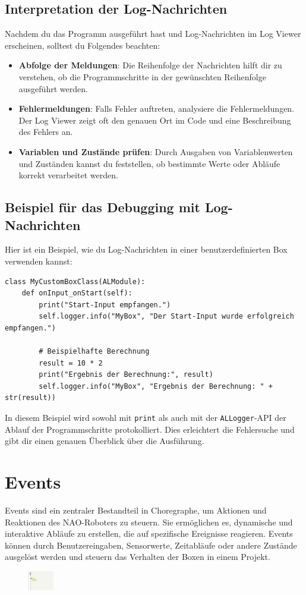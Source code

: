 \subsection{Interpretation der Log-Nachrichten}
Nachdem du das Programm ausgeführt hast und Log-Nachrichten im Log Viewer erscheinen, solltest du Folgendes beachten:
\begin{itemize}
    \item \textbf{Abfolge der Meldungen}: Die Reihenfolge der Nachrichten hilft dir zu verstehen, ob die Programmschritte in der gewünschten Reihenfolge ausgeführt werden.
    \item \textbf{Fehlermeldungen}: Falls Fehler auftreten, analysiere die Fehlermeldungen. Der Log Viewer zeigt oft den genauen Ort im Code und eine Beschreibung des Fehlers an.
    \item \textbf{Variablen und Zustände prüfen}: Durch Ausgaben von Variablenwerten und Zuständen kannst du feststellen, ob bestimmte Werte oder Abläufe korrekt verarbeitet werden.
\end{itemize}

\subsection{Beispiel für das Debugging mit Log-Nachrichten}
Hier ist ein Beispiel, wie du Log-Nachrichten in einer benutzerdefinierten Box verwenden kannst:
\begin{verbatim}
class MyCustomBoxClass(ALModule):
    def onInput_onStart(self):
        print("Start-Input empfangen.")
        self.logger.info("MyBox", "Der Start-Input wurde erfolgreich empfangen.")
        
        # Beispielhafte Berechnung
        result = 10 * 2
        print("Ergebnis der Berechnung:", result)
        self.logger.info("MyBox", "Ergebnis der Berechnung: " + str(result))
\end{verbatim}
In diesem Beispiel wird sowohl mit \texttt{print} als auch mit der \texttt{ALLogger}-API der Ablauf der Programmschritte protokolliert. Dies erleichtert die Fehlersuche und gibt dir einen genauen Überblick über die Ausführung.

\section{Events}\label{events}
Events sind ein zentraler Bestandteil in Choregraphe, um Aktionen und Reaktionen des NAO-Roboters zu steuern. Sie ermöglichen es, dynamische und interaktive Abläufe zu erstellen, die auf spezifische Ereignisse reagieren. Events können durch Benutzereingaben, Sensorwerte, Zeitabläufe oder andere Zustände ausgelöst werden und steuern das Verhalten der Boxen in einem Projekt.
\begin{figure}[h]
    \centering
    \includegraphics[width=0.1\textwidth]{../images/event.png}
    \label{fig:event}
\end{figure}
